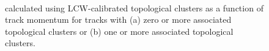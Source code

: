 \begin{figure}[h]
\centering
{}
~
\caption{\epcor calculated using LCW-calibrated topological clusters as a function of track momentum for tracks with (a) zero or more associated topological clusters or (b) one or more associated topological clusters.}
\label{fig:eoverp_corrected_lcw}
\end{figure}


